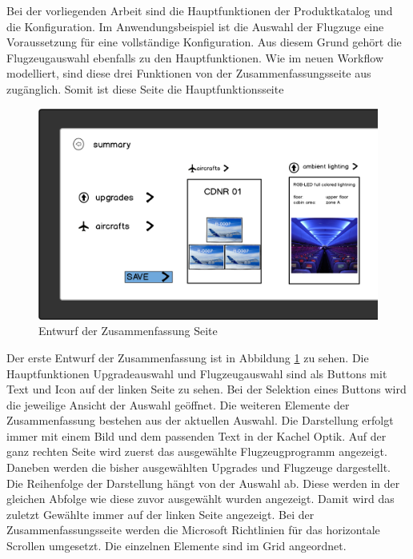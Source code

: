 Bei der vorliegenden Arbeit sind die Hauptfunktionen der Produktkatalog und die Konfiguration. Im Anwendungsbeispiel ist die Auswahl der Flugzuge eine Voraussetzung für eine vollständige Konfiguration. Aus diesem Grund gehört die Flugzeugauswahl ebenfalls zu den Hauptfunktionen. Wie im neuen Workflow modelliert, sind diese drei Funktionen von der Zusammenfassungsseite aus zugänglich. Somit ist diese Seite die Hauptfunktionsseite\par 
\begin{figure}[H]
\centering
\includegraphics[width=\hsize]{images/summary_entwurf}
\caption{Entwurf der Zusammenfassung Seite}
\label{summarySketch}
\end{figure}

Der erste Entwurf der Zusammenfassung ist in Abbildung \ref{summarySketch} zu sehen. Die Hauptfunktionen Upgradeauswahl und Flugzeugauswahl sind als Buttons mit Text und Icon auf der linken Seite zu sehen. Bei der Selektion eines Buttons wird die jeweilige Ansicht der Auswahl geöffnet. Die weiteren Elemente der Zusammenfassung bestehen aus der aktuellen Auswahl. Die Darstellung erfolgt immer mit einem Bild und dem passenden Text in der Kachel Optik. Auf der ganz rechten Seite wird zuerst das ausgewählte Flugzeugprogramm angezeigt. Daneben werden die bisher ausgewählten Upgrades und Flugzeuge dargestellt. Die Reihenfolge der Darstellung hängt von der Auswahl ab. Diese werden in der gleichen Abfolge wie diese zuvor ausgewählt wurden angezeigt. Damit wird das zuletzt Gewählte immer auf der linken Seite angezeigt. Bei der Zusammenfassungsseite werden die Microsoft Richtlinien für das horizontale Scrollen umgesetzt. Die einzelnen Elemente sind im Grid angeordnet.


